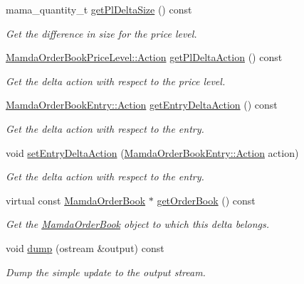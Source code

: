 \begin{CompactItemize}
mama\_\-quantity\_\-t \hyperlink{classWombat_1_1MamdaOrderBookBasicDelta_53cad3d942a1c100cdbadc0cf0f4ddd3}{get\-Pl\-Delta\-Size} () const 
\begin{CompactList}\small\item\em Get the difference in size for the price level. \item\end{CompactList}\item 
\hyperlink{classWombat_1_1MamdaOrderBookPriceLevel_bd3407b4250fc6f7a42d94b6d32e358a}{Mamda\-Order\-Book\-Price\-Level::Action} \hyperlink{classWombat_1_1MamdaOrderBookBasicDelta_010b4c53083f76c3f10c5a33dd45cec8}{get\-Pl\-Delta\-Action} () const 
\begin{CompactList}\small\item\em Get the delta action with respect to the price level. \item\end{CompactList}\item 
\hyperlink{classWombat_1_1MamdaOrderBookEntry_fc6cb1d67c7601d093a36f59cf9bcef4}{Mamda\-Order\-Book\-Entry::Action} \hyperlink{classWombat_1_1MamdaOrderBookBasicDelta_54c664c4fa696cf6ae79f62db7d434da}{get\-Entry\-Delta\-Action} () const 
\begin{CompactList}\small\item\em Get the delta action with respect to the entry. \item\end{CompactList}\item 
void \hyperlink{classWombat_1_1MamdaOrderBookBasicDelta_a891db48e540e1c71fc2fb11552e8e95}{set\-Entry\-Delta\-Action} (\hyperlink{classWombat_1_1MamdaOrderBookEntry_fc6cb1d67c7601d093a36f59cf9bcef4}{Mamda\-Order\-Book\-Entry::Action} action)
\begin{CompactList}\small\item\em Get the delta action with respect to the entry. \item\end{CompactList}\item 
virtual const \hyperlink{classWombat_1_1MamdaOrderBook}{Mamda\-Order\-Book} $\ast$ \hyperlink{classWombat_1_1MamdaOrderBookBasicDelta_9fb6ae94903535161a689fce7dc7cc4d}{get\-Order\-Book} () const 
\begin{CompactList}\small\item\em Get the \hyperlink{classWombat_1_1MamdaOrderBook}{Mamda\-Order\-Book} object to which this delta belongs. \item\end{CompactList}\item 
void \hyperlink{classWombat_1_1MamdaOrderBookBasicDelta_f3387069184400eb065fb59bf27b2812}{dump} (ostream \&output) const 
\begin{CompactList}\small\item\em Dump the simple update to the output stream. \item\end{CompactList}\end{CompactItemize}

